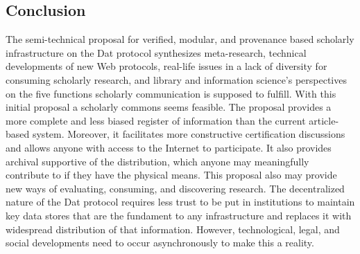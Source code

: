 \documentclass[publications,article,submit,moreauthors,pdftex,10pt,a4paper]{Definitions/mdpi}
\begin{document}
\hypertarget{conclusion}{%
\subsection{Conclusion}\label{conclusion}}

The semi-technical proposal for verified, modular, and provenance based
scholarly infrastructure on the Dat protocol synthesizes meta-research,
technical developments of new Web protocols, real-life issues in a lack
of diversity for consuming scholarly research, and library and
information science's perspectives on the five functions scholarly
communication is supposed to fulfill. With this initial proposal a
scholarly commons seems feasible. The proposal provides a more complete
and less biased register of information than the current article-based
system. Moreover, it facilitates more constructive certification
discussions and allows anyone with access to the Internet to
participate. It also provides archival supportive of the distribution,
which anyone may meaningfully contribute to if they have the physical
means. This proposal also may provide new ways of evaluating, consuming,
and discovering research. The decentralized nature of the Dat protocol
requires less trust to be put in institutions to maintain key data
stores that are the fundament to any infrastructure and replaces it with
widespread distribution of that information. However, technological,
legal, and social developments need to occur asynchronously to make this
a reality.

\vspace{6pt} 



\end{document}
